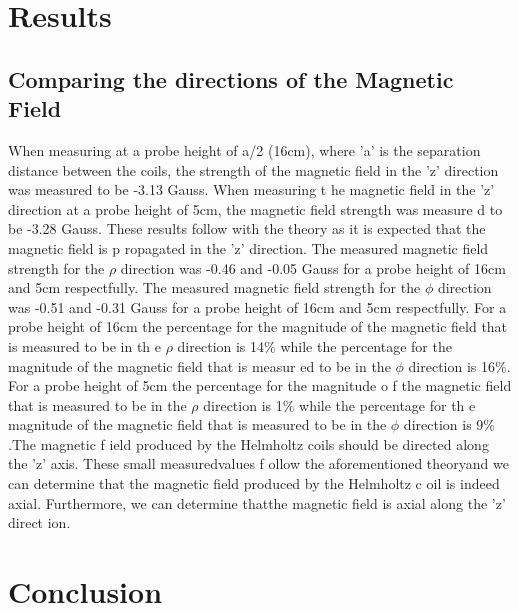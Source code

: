 \documentclass[a4paper]{article}
\begin{document}



\section{Results}



\subsection{Comparing the directions of the Magnetic Field}

\qq When measuring at a probe height of a/2 (16cm), where 'a' is the separation
distance between the coils, the strength of the magnetic field in the 'z'
direction was measured to be -3.13 Gauss. When measuring t he magnetic field in
the 'z' direction at a probe height of 5cm, the magnetic field strength was
measure d to be -3.28 Gauss. These results follow with the theory as it is
expected that the magnetic field is p ropagated in the 'z' direction. The
measured magnetic field strength for the $\rho$ direction was -0.46 and -0.05
Gauss for a probe height of 16cm and 5cm respectfully. The measured magnetic
field strength for the $\phi$ direction was -0.51 and -0.31 Gauss for a probe
height of 16cm and 5cm respectfully. For a probe height of 16cm the percentage
for the magnitude of the magnetic field that is measured to be in th e $\rho$
direction is 14$\%$ while the percentage for the magnitude of the magnetic field
that is measur ed to be in the $\phi$ direction is 16$\%$. For a probe height of
5cm the percentage for the magnitude o f the magnetic field that is measured to
be in the $\rho$ direction is 1$\%$ while the percentage for th e magnitude of
the magnetic field that is measured to be in the $\phi$ direction is 9$\%$.The
magnetic f ield produced by the Helmholtz coils should be directed along the 'z'
axis. These small measuredvalues f ollow the aforementioned theoryand we can
determine that the magnetic field produced by the Helmholtz c oil is indeed
axial. Furthermore, we can determine thatthe magnetic field is axial along the
'z' direct ion.

\section{Conclusion}
\end{document}
